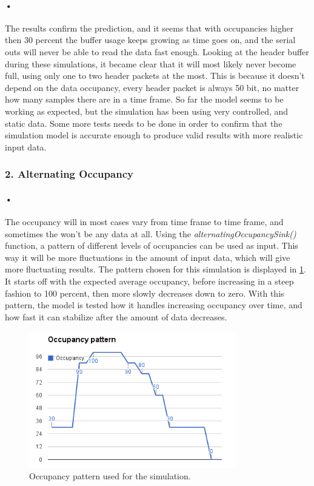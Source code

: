 \documentclass[a4paper, 12pt]{report}
\begin{document}
\paragraph{•} %
The results confirm the prediction, and it seems that with occupancies higher then 30 percent the buffer usage keeps growing as time goes on, and the serial outs will never be able to read the data fast enough.
Looking at the header buffer during these simulations, it became clear that it will most likely never become full, using only one to two header packets at the most.
This is because it doesn't depend on the data occupancy, every header packet is always 50 bit, no matter how many samples there are in a time frame.
So far the model seems to be working as expected, but the simulation has been using very controlled, and static data.
Some more tests needs to be done in order to confirm that the simulation model is accurate enough to produce valid results with more realistic input data.

\subsubsection{2. Alternating Occupancy}

\paragraph{•} %
The occupancy will in most cases vary from time frame to time frame, and sometimes the won't be any data at all.
Using the \textit{alternatingOccupancySink()} function, a pattern of different levels of occupancies can be used as input.
This way it will be more fluctuations in the amount of input data, which will give more fluctuating results.
The pattern chosen for this simulation is displayed in \ref{fig:occ-pattern}.
It starts off with the expected average occupancy, before increasing in a steep fashion to 100 percent, then more slowly decreases down to zero.
With this pattern, the model is tested how it handles increasing occupancy over time, and how fast it can stabilize after the amount of data decreases.

\begin{figure}[h!]
	\centering
		\includegraphics[width=0.8\textwidth]{images/occ-pattern.png}
		\caption{Occupancy pattern used for the simulation.}
		\label{fig:occ-pattern}
\end{figure}
\end{document}
